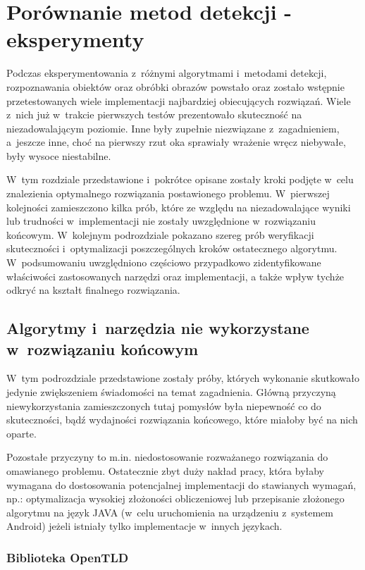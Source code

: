 \chapter{Porównanie metod detekcji - eksperymenty}

Podczas eksperymentowania z~różnymi algorytmami i~metodami detekcji,
rozpoznawania obiektów oraz obróbki obrazów powstało
oraz zostało wstępnie przetestowanych wiele implementacji
najbardziej obiecujących rozwiązań. Wiele z~nich już w~trakcie
pierwszych testów prezentowało skuteczność na niezadowalającym
poziomie. Inne były zupełnie niezwiązane z~zagadnieniem,
a~jeszcze inne, choć na pierwszy rzut oka sprawiały wrażenie
wręcz niebywałe, były wysoce niestabilne.

W~tym rozdziale przedstawione i~pokrótce opisane zostały kroki podjęte
w~celu znalezienia optymalnego rozwiązania postawionego 
problemu. 
W~pierwszej kolejności zamieszczono kilka prób, które ze względu
na niezadowalające wyniki lub trudności w~implementacji
nie zostały uwzględnione w~rozwiązaniu końcowym. W~kolejnym podrozdziale
pokazano szereg prób weryfikacji skuteczności i~optymalizacji 
poszczególnych kroków ostatecznego algorytmu. W~podsumowaniu uwzględniono
częściowo przypadkowo zidentyfikowane właściwości zastosowanych
narzędzi oraz implementacji, a także wpływ tychże odkryć na
kształt finalnego rozwiązania.

\section{Algorytmy i~narzędzia nie wykorzystane w~rozwiązaniu końcowym}

W~tym podrozdziale przedstawione zostały próby, których wykonanie
skutkowało jedynie zwiększeniem świadomości na temat zagadnienia.
Główną przyczyną niewykorzystania zamieszczonych tutaj pomysłów
była niepewność co do skuteczności, bądź wydajności rozwiązania końcowego,
które miałoby być na nich oparte.

Pozostałe przyczyny to m.in. niedostosowanie rozważanego rozwiązania
do omawianego problemu. Ostatecznie zbyt duży nakład pracy, która
byłaby wymagana do dostosowania potencjalnej implementacji do
stawianych wymagań, np.: optymalizacja wysokiej złożoności obliczeniowej
lub przepisanie złożonego algorytmu na język JAVA
(w~celu uruchomienia na urządzeniu z~systemem Android)
jeżeli istniały tylko implementacje w~innych językach.

\subsection{Biblioteka OpenTLD}

